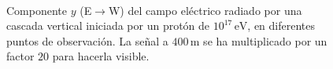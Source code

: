 \documentclass[11 pt, a4paper]{article} %
\numberwithin{equation}{section}
\numberwithin{figure}{section}
\numberwithin{table}{section}
\begin{document}
\begin{figure}[H]
	\centering
	\\
	\caption{Componente $y$ (E$\rightarrow$W) del campo eléctrico radiado por una cascada vertical iniciada por un protón de $10^{17}\,\mathrm{eV}$, en diferentes puntos de observación. La señal a $400\,\mathrm{m}$ se ha multiplicado por un factor $20$ para hacerla visible.}
	\label{EW_field}
\end{figure}
\end{document}
